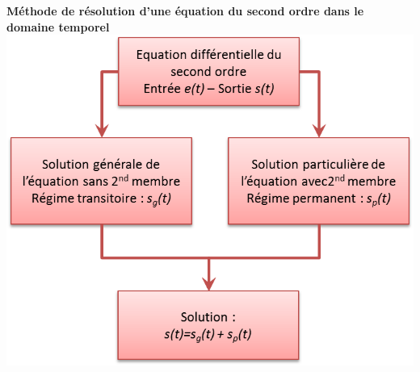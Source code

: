 \documentclass[10pt,fleqn]{article} %
\begin{document}
\begin{minipage}[c]{.45\linewidth}
\begin{center}
\textbf{Méthode de résolution d'une équation du second ordre dans le domaine temporel}
\includegraphics[width=\textwidth]{images/temporel}
\end{center}
\end{minipage} \hfill
\end{document}
